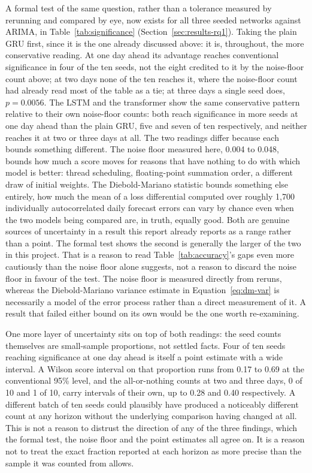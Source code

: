 \documentclass[12pt,a4paper]{report}
\begin{document}
A formal test of the same question, rather than a tolerance measured by
rerunning and compared by eye, now exists for all three seeded networks
against ARIMA, in Table~\ref{tab:significance} (Section~\ref{sec:results-rq1}).
Taking the plain GRU first, since it is the one already discussed above: it
is, throughout, the more conservative reading. At one day ahead its
advantage reaches conventional significance in four of the ten seeds, not
the eight credited to it by the noise-floor count above; at two days none
of the ten reaches it, where the noise-floor count had already read most of
the table as a tie; at three days a single seed does, $p=0.0056$. The LSTM
and the transformer show the same conservative pattern relative to their
own noise-floor counts: both reach significance in more seeds at one day
ahead than the plain GRU, five and seven of ten respectively, and neither
reaches it at two or three days at all. The two readings differ because each
bounds something different. The noise floor measured here, 0.004 to 0.048,
bounds how much a score moves for reasons that have nothing to do with which
model is better: thread scheduling, floating-point summation order, a
different draw of initial weights. The Diebold-Mariano statistic bounds
something else entirely, how much the mean of a loss differential computed
over roughly 1{,}700 individually autocorrelated daily forecast errors can
vary by chance even when the two models being compared are, in truth,
equally good. Both are genuine sources of uncertainty in a result this
report already reports as a range rather than a point. The formal test shows
the second is generally the larger of the two in this project. That is a
reason to read Table~\ref{tab:accuracy}'s gaps even more cautiously than the
noise floor alone suggests, not a reason to discard the noise floor in
favour of the test. The noise floor is measured directly from reruns,
whereas the Diebold-Mariano variance estimate in Equation~\ref{eq:dm-var} is
necessarily a model of the error process rather than a direct measurement
of it. A result that failed either bound on its own would be the one worth
re-examining.

One more layer of uncertainty sits on top of both readings: the seed
counts themselves are small-sample proportions, not settled facts. Four
of ten seeds reaching significance at one day ahead is itself a point
estimate with a wide interval. A Wilson score interval on that proportion
runs from 0.17 to 0.69 at the conventional 95\% level, and the
all-or-nothing counts at two and three days, 0 of 10 and 1 of 10, carry
intervals of their own, up to 0.28 and 0.40 respectively. A different
batch of ten seeds could plausibly have produced a noticeably different
count at any horizon without the underlying comparison having changed at
all. This is not a reason to distrust the direction of any of the three
findings, which the formal test, the noise floor and the point estimates
all agree on. It is a reason not to treat the exact fraction reported
at each horizon as more precise than the sample it was counted from
allows.
\end{document}

